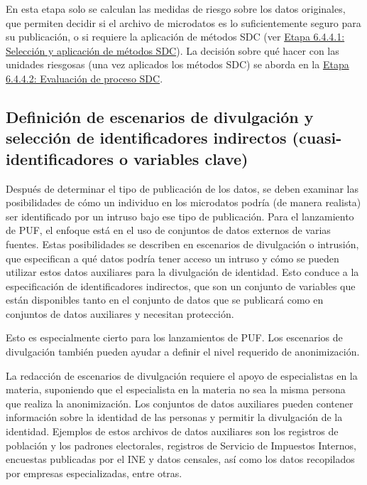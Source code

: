 \documentclass[]{book}
\theoremstyle{definition}
\theoremstyle{definition}
\theoremstyle{definition}
\theoremstyle{definition}
\theoremstyle{remark}
\begin{document}
En esta etapa solo se calculan las medidas de riesgo sobre los datos originales, que permiten decidir si el archivo de microdatos es lo suficientemente seguro para su publicación, o si requiere la aplicación de métodos SDC (ver \protect\hyperlink{etapa-6.4.4.1-selecciuxf3n-y-aplicaciuxf3n-de-muxe9todos-sdc}{Etapa 6.4.4.1: Selección y aplicación de métodos SDC}). La decisión sobre qué hacer con las unidades riesgosas (una vez aplicados los métodos SDC) se aborda en la \protect\hyperlink{etapa-6.4.4.2-evaluaciuxf3n-de-proceso-sdc}{Etapa 6.4.4.2: Evaluación de proceso SDC}.

\hypertarget{definiciuxf3n-de-escenarios-de-divulgaciuxf3n-y-selecciuxf3n-de-identificadores-indirectos-cuasi-identificadores-o-variables-clave}{%
\subsection{Definición de escenarios de divulgación y selección de identificadores indirectos (cuasi-identificadores o variables clave)}\label{definiciuxf3n-de-escenarios-de-divulgaciuxf3n-y-selecciuxf3n-de-identificadores-indirectos-cuasi-identificadores-o-variables-clave}}

Después de determinar el tipo de publicación de los datos, se deben examinar las posibilidades de cómo un individuo en los microdatos podría (de manera realista) ser identificado por un intruso bajo ese tipo de publicación. Para el lanzamiento de PUF, el enfoque está en el uso de conjuntos de datos externos de varias fuentes. Estas posibilidades se describen en escenarios de divulgación o intrusión, que especifican a qué datos podría tener acceso un intruso y cómo se pueden utilizar estos datos auxiliares para la divulgación de identidad. Esto conduce a la especificación de identificadores indirectos, que son un conjunto de variables que están disponibles tanto en el conjunto de datos que se publicará como en conjuntos de datos auxiliares y necesitan protección.

Esto es especialmente cierto para los lanzamientos de PUF. Los escenarios de divulgación también pueden ayudar a definir el nivel requerido de anonimización.

La redacción de escenarios de divulgación requiere el apoyo de especialistas en la materia, suponiendo que el especialista en la materia no sea la misma persona que realiza la anonimización. Los conjuntos de datos auxiliares pueden contener información sobre la identidad de las personas y permitir la divulgación de la identidad. Ejemplos de estos archivos de datos auxiliares son los registros de población y los padrones electorales, registros de Servicio de Impuestos Internos, encuestas publicadas por el INE y datos censales, así como los datos recopilados por empresas especializadas, entre otras.
\end{document}
